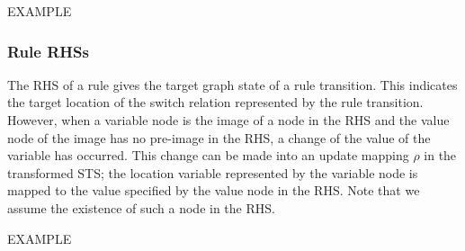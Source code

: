 EXAMPLE

\subsubsection{Rule RHSs}
The RHS of a rule gives the target graph state of a rule transition. This indicates the target location of the switch relation represented by the rule transition. However, when a variable node is the image of a node in the RHS and the value node of the image has no pre-image in the RHS, a change of the value of the variable has occurred. This change can be made into an update mapping $\rho$ in the transformed STS; the location variable represented by the variable node is mapped to the value specified by the value node in the RHS. Note that we assume the existence of such a node in the RHS.

EXAMPLE
